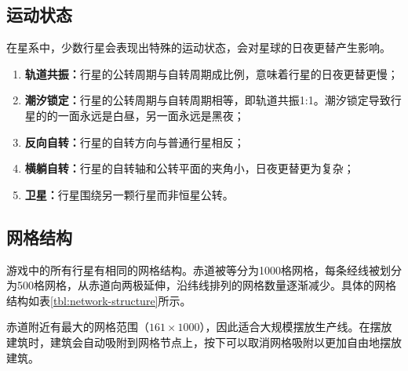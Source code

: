 
\subsection{运动状态}


在星系中，少数行星会表现出特殊的运动状态，会对星球的日夜更替产生影响。

\begin{enumerate}
    \item \textbf{轨道共振：}行星的公转周期与自转周期成比例，意味着行星的日夜更替更慢；
    \item \textbf{潮汐锁定：}行星的公转周期与自转周期相等，即轨道共振1:1。潮汐锁定导致行星的的一面永远是白昼，另一面永远是黑夜；
    \item \textbf{反向自转：}行星的自转方向与普通行星相反；
    \item \textbf{横躺自转：}行星的自转轴和公转平面的夹角小，日夜更替更为复杂；
    \item \textbf{卫星：}行星围绕另一颗行星而非恒星公转。
\end{enumerate}

\subsection{网格结构}

游戏中的所有行星有相同的网格结构。赤道被等分为1000格网格，每条经线被划分为500格网格，从赤道向两极延伸，沿纬线排列的网格数量逐渐减少。具体的网格结构如表\ref{tbl:network-structure}所示。

赤道附近有最大的网格范围（$161\times 1000$），因此适合大规模摆放生产线。在摆放建筑时，建筑会自动吸附到网格节点上，按下可以取消网格吸附以更加自由地摆放建筑。

